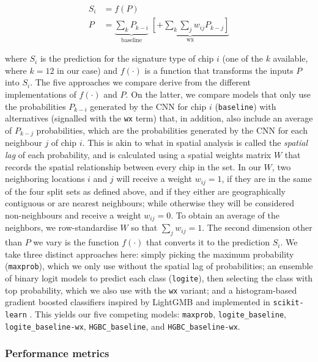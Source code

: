 \begin{equation}
\begin{split}
        S_i & = f(P) \\
        P & = \underbrace{
                \sum_{k} P_{k-i}
        }_\text{baseline}\;
        \underbrace{
        \left[+ \sum_{k} \sum_j w_{ij} P_{k-j}\right]
}_\text{wx}
        \label{eq:sp_model}
\end{split}
\end{equation}

where $S_i$ is the prediction for the signature type of chip $i$ (one of the $k$ available, where
$k=12$ in our case) and $f(\cdot)$ is a function that
transforms the inputs $P$ into $S_i$. The five
approaches we compare derive from the different implementations of $f(\cdot)$
and $P$. On the latter, we compare models that only use the probabilities
$P_{k-i}$ generated by the CNN for chip $i$ (\texttt{baseline}) with alternatives
(signalled with the \texttt{wx} term) that, in addition,
also include an average of $P_{k-j}$ probabilities, which are the
probabilities generated by the CNN for each neighbour $j$ of chip $i$. This is
akin to what in spatial analysis is called the \textit{spatial lag} of each
probability, and is calculated using a spatial weights matrix $W$ that records
the spatial relationship between every chip in the set. In our $W$, two
neighboring locations $i$ and $j$ will receive a weight $w_{ij}=1$,
if they are in the same of the four split sets as defined above, and if they
either are geographically contiguous or are nearest neighbours; while otherwise
they will be considered non-neighbours and receive a weight $w_{ij}=0$. To obtain
an average of the neighbors, we row-standardise $W$ so that $\sum_j w_{ij} =
1$. The second dimension other than $P$ we vary is the function $f(\cdot)$ that converts
it to the prediction $S_i$. We take three distinct approaches here: simply
picking the maximum probability (\texttt{maxprob}), which we only use without the spatial lag of
probabilities; an ensemble of binary logit models to predict each class
(\texttt{logite}), then selecting the class with top probability, which we
also use with the \texttt{wx} variant; and a histogram-based gradient boosted
classifiers inspired by LightGMB \citep{ke2017lightgbm} and implemented in
\texttt{scikit-learn} \citep{pedregosa2011scikit}. This yields our five
competing models:
\texttt{maxprob}, \texttt{logite\_baseline}, \texttt{logite\_baseline-wx},
\texttt{HGBC\_baseline}, and \texttt{HGBC\_baseline-wx}.

\subsubsection{Performance metrics}

